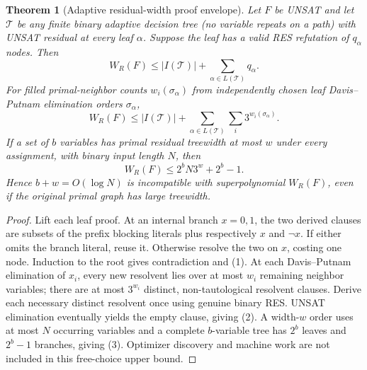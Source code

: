 \documentclass[11pt]{article}
\newtheorem{theorem}{Theorem}
\begin{document}
\begin{theorem}[Adaptive residual-width proof envelope]
Let $F$ be UNSAT and let $\mathcal T$ be any finite binary adaptive decision tree (no variable repeats on a path) with UNSAT residual at every leaf $\alpha$. Suppose the leaf has a valid RES refutation of $q_\alpha$ nodes. Then
\[
\boxed{W_R(F)\le |I(\mathcal T)|+\sum_{\alpha\in L(\mathcal T)}q_\alpha.}\tag{1}
\]
For filled primal-neighbor counts $w_i(\sigma_\alpha)$ from independently chosen leaf Davis--Putnam elimination orders $\sigma_\alpha$,
\[
\boxed{W_R(F)\le |I(\mathcal T)|+\sum_{\alpha\in L(\mathcal T)}\sum_i3^{w_i(\sigma_\alpha)}.}\tag{2}
\]
If a set of $b$ variables has primal residual treewidth at most $w$ under every assignment, with binary input length $N$, then
\[
\boxed{W_R(F)\le 2^bN3^w+2^b-1.}\tag{3}
\]
Hence $b+w=O(\log N)$ is incompatible with superpolynomial $W_R(F)$, even if the original primal graph has large treewidth.
\end{theorem}
\begin{proof}
Lift each leaf proof. At an internal branch $x=0,1$, the two derived clauses are subsets of the prefix blocking literals plus respectively $x$ and $\neg x$. If either omits the branch literal, reuse it. Otherwise resolve the two on $x$, costing one node. Induction to the root gives contradiction and (1). At each Davis--Putnam elimination of $x_i$, every new resolvent lies over at most $w_i$ remaining neighbor variables; there are at most $3^{w_i}$ distinct, non-tautological resolvent clauses. Derive each necessary distinct resolvent once using genuine binary RES. UNSAT elimination eventually yields the empty clause, giving (2). A width-$w$ order uses at most $N$ occurring variables and a complete $b$-variable tree has $2^b$ leaves and $2^b-1$ branches, giving (3). Optimizer discovery and machine work are not included in this free-choice upper bound.
\end{proof}
\end{document}
